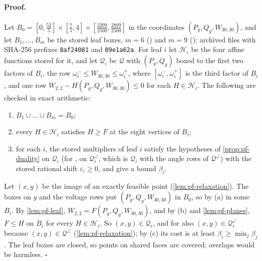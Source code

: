 \paragraph{Proof.}
Let $B_0=[0,\tfrac{52}{5}]\times[\tfrac75,4]\times[\tfrac{2209}{2500},\tfrac{2809}{2500}]$ in the coordinates $(P_g,Q_g,W_{30,30})$, and let $B_1,\dots,B_m$ be the stored leaf boxes, $m=6$ () and $m=9$ (); archived files with SHA-256 prefixes \texttt{8af24081} and \texttt{09e1a62a}.
For leaf $i$ let $\mathcal H_i$ be the four affine functions stored for it, and let $\mathcal Q_i$ be $\mathcal Q$ with
$(P_g,Q_g)$ boxed to the first two factors of $B_i$, the row $\omega_i^-\le W_{30,30}\le\omega_i^+$, where $[\omega_i^-,\omega_i^+]$ is the third factor of $B_i$, and one row $W_{2,2}-H(P_g,Q_g,W_{30,30})\le0$ for each $H\in\mathcal H_i$.
The following are checked in exact arithmetic:
\begin{enumerate}
\item[(a)] $B_1\cup\dots\cup B_m=B_0$;
\item[(b)] every $H\in\mathcal H_i$ satisfies $H\ge F$ at the eight vertices of $B_i$;
\item[(c)] for each $i$, the stored multipliers of leaf $i$ satisfy the hypotheses of \cref{prop:pf-duality} on $\mathcal Q_i$ (for , on $\mathcal Q_i^\angle$, which is $\mathcal Q_i$ with the angle rows of $\mathcal Q^\angle$) with the stored rational shift $\varepsilon_i\ge0$, and give a bound $\beta_i$.
\end{enumerate}
Let $(x,y)$ be the image of an exactly feasible point (\cref{lem:pf-relaxation}).
The boxes on $y$ and the voltage rows put $(P_g,Q_g,W_{30,30})$ in $B_0$, so by (a) in some $B_i$.
By \cref{lem:pf-leaf}, $W_{2,2}=F(P_g,Q_g,W_{30,30})$, and by (b) and \cref{lem:pf-planes}, $F\le H$ on $B_i$ for every $H\in\mathcal H_i$.
So $(x,y)\in\mathcal Q_i$, and for  also $(x,y)\in\mathcal Q_i^\angle$ because $(x,y)\in\mathcal Q^\angle$ (\cref{lem:pf-relaxation}); by (c) its cost is at least $\beta_i\ge\min_j\beta_j$.
The leaf boxes are closed, so points on shared faces are covered; overlaps would be harmless.
\hfill$\square$

